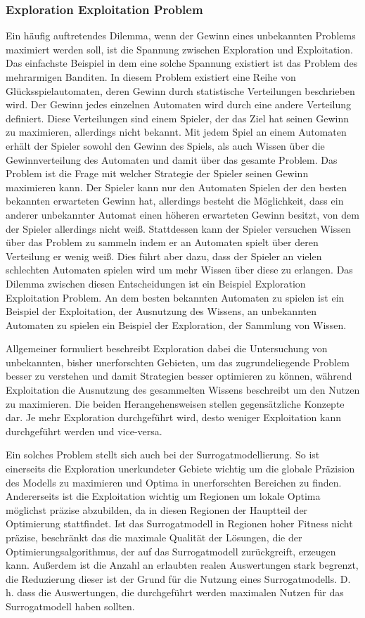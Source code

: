 \subsubsection{Exploration Exploitation Problem}
\label{sub:exploration_exploitation}
Ein häufig auftretendes Dilemma, wenn der Gewinn eines unbekannten Problems maximiert werden soll, ist die Spannung zwischen Exploration und Exploitation.
Das einfachste Beispiel in dem eine solche Spannung existiert ist das Problem des mehrarmigen Banditen.
In diesem Problem existiert eine Reihe von Glücksspielautomaten, deren Gewinn durch statistische Verteilungen beschrieben wird.
Der Gewinn jedes einzelnen Automaten wird durch eine andere Verteilung definiert.
Diese Verteilungen sind einem Spieler, der das Ziel hat seinen Gewinn zu maximieren, allerdings nicht bekannt.
Mit jedem Spiel an einem Automaten erhält der Spieler sowohl den Gewinn des Spiels, als auch Wissen über die Gewinnverteilung des Automaten und damit über das gesamte Problem.
Das Problem ist die Frage mit welcher Strategie der Spieler seinen Gewinn maximieren kann.
Der Spieler kann nur den Automaten Spielen der den besten bekannten erwarteten Gewinn hat, allerdings besteht die Möglichkeit, dass ein anderer unbekannter Automat einen höheren erwarteten Gewinn besitzt, von dem der Spieler allerdings nicht weiß.
Stattdessen kann der Spieler versuchen Wissen über das Problem zu sammeln indem er an Automaten spielt über deren Verteilung er wenig weiß. 
Dies führt aber dazu, dass der Spieler an vielen schlechten Automaten spielen wird um mehr Wissen über diese zu erlangen.
Das Dilemma zwischen diesen Entscheidungen ist ein Beispiel Exploration Exploitation Problem.
An dem besten bekannten Automaten zu spielen ist ein Beispiel der Exploitation, der Ausnutzung des Wissens, an unbekannten Automaten zu spielen ein Beispiel der Exploration, der Sammlung von Wissen.

Allgemeiner formuliert beschreibt Exploration dabei die Untersuchung von unbekannten, bisher unerforschten Gebieten, um das zugrundeliegende Problem besser zu verstehen und damit Strategien besser optimieren zu können, während Exploitation die Ausnutzung des gesammelten Wissens beschreibt um den Nutzen zu maximieren.
Die beiden Herangehensweisen stellen gegensätzliche Konzepte dar.
Je mehr Exploration durchgeführt wird, desto weniger Exploitation kann durchgeführt werden und vice-versa.

Ein solches Problem stellt sich auch bei der Surrogatmodellierung.
So ist einerseits die Exploration unerkundeter Gebiete wichtig um die globale Präzision des Modells zu maximieren und Optima in unerforschten Bereichen zu finden.
Andererseits ist die Exploitation wichtig um Regionen um lokale Optima möglichst präzise abzubilden, da in diesen Regionen der Hauptteil der Optimierung stattfindet.
Ist das Surrogatmodell in Regionen hoher Fitness nicht präzise, beschränkt das die maximale Qualität der Lösungen, die der Optimierungsalgorithmus, der auf das Surrogatmodell zurückgreift, erzeugen kann.
Außerdem ist die Anzahl an erlaubten realen Auswertungen stark begrenzt, die Reduzierung dieser ist der Grund für die Nutzung eines Surrogatmodells.
D. h. dass die Auswertungen, die durchgeführt werden maximalen Nutzen für das Surrogatmodell haben sollten.

